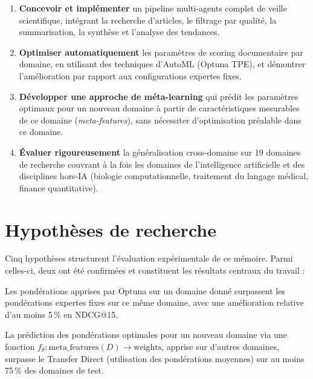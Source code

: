 \begin{enumerate}
  \item \textbf{Concevoir et implémenter} un pipeline multi-agents complet de
    veille scientifique, intégrant la recherche d'articles, le filtrage par
    qualité, la summarisation, la synthèse et l'analyse des tendances.

  \item \textbf{Optimiser automatiquement} les paramètres de scoring documentaire
    par domaine, en utilisant des techniques d'AutoML (Optuna TPE), et démontrer
    l'amélioration par rapport aux configurations expertes fixes.

  \item \textbf{Développer une approche de méta-learning} qui prédit les
    paramètres optimaux pour un nouveau domaine à partir de caractéristiques
    mesurables de ce domaine (\textit{meta-features}), sans nécessiter
    d'optimisation préalable dans ce domaine.

  \item \textbf{Évaluer rigoureusement} la généralisation cross-domaine sur
    19 domaines de recherche couvrant à la fois les domaines de l'intelligence
    artificielle et des disciplines hors-IA (biologie computationnelle,
    traitement du langage médical, finance quantitative).
\end{enumerate}

\section{Hypothèses de recherche}
\label{sec:hypotheses}

Cinq hypothèses structurent l'évaluation expérimentale de ce mémoire.
Parmi celles-ci, deux ont été confirmées et constituent les résultats
centraux du travail :

\begin{hypothese}
  Les pondérations apprises par Optuna sur un domaine donné surpassent
  les pondérations expertes fixes sur ce même domaine, avec une amélioration
  relative d'au moins 5\,\% en NDCG@15.
\end{hypothese}

\begin{hypothese}
  La prédiction des pondérations optimales pour un nouveau domaine via
  une fonction $f_\theta : \text{meta\_features}(D) \to \text{weights}$,
  apprise sur d'autres domaines, surpasse le Transfer Direct
  (utilisation des pondérations moyennes) sur au moins 75\,\% des
  domaines de test.
\end{hypothese}

